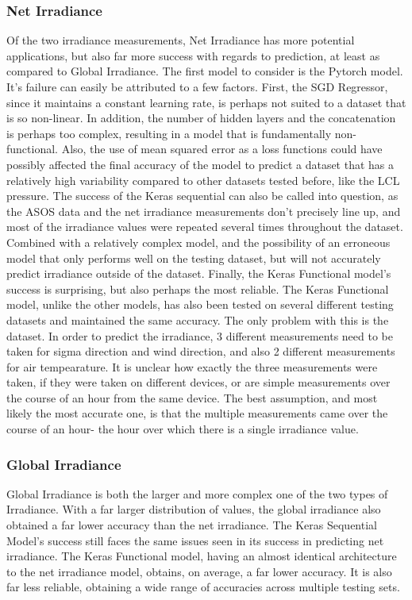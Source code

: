 \documentclass[conference]{IEEEtran}
\begin{document}
\subsubsection{Net Irradiance}
Of the two irradiance measurements, Net Irradiance has more potential applications, but also far more success with regards to prediction, at least as compared to Global Irradiance. The first model to consider is the Pytorch model. It's failure can easily be attributed to a few factors. First, the SGD Regressor, since it maintains a constant learning rate, is perhaps not suited to a dataset that is so non-linear. In addition, the number of hidden layers and the concatenation is perhaps too complex, resulting in a model that is fundamentally non-functional. Also, the use of mean squared error as a loss functions could have possibly affected the final accuracy of the model to predict a dataset that has a relatively high variability compared to other datasets tested before, like the LCL pressure. The success of the Keras sequential can also be called into question, as the ASOS data and the net irradiance measurements don't precisely line up, and most of the irradiance values were repeated several 
times throughout the dataset. Combined with a relatively complex model, and the possibility of an erroneous model that only performs well on the testing dataset, but will not accurately predict irradiance outside of the dataset. Finally, the Keras Functional model's success is surprising, but also perhaps the most reliable. The Keras Functional model, unlike the other models, has also been tested on several different testing datasets and maintained the same accuracy. The only problem with this is the dataset. In order to predict the irradiance, 3 different measurements need to be taken for sigma direction and wind direction, and also 2 different measurements for air tempearature. It is unclear how exactly the three measurements were taken, if they were taken on different devices, or are simple measurements over the course of an hour from the same device. The best assumption, and most likely the most accurate one, is that the multiple measurements came over the course of an hour- the hour over which there is a single irradiance value. 
\subsubsection{Global Irradiance}
Global Irradiance is both the larger and more complex one of the two types of Irradiance. With a far larger distribution of values, the global irradiance also obtained a far lower accuracy than the net irradiance. The Keras Sequential Model's success still faces the same issues seen in its success in predicting net irradiance. The Keras Functional model, having an almost identical architecture to the net irradiance model, obtains, on average, a far lower accuracy. It is also far less reliable, obtaining a wide range of accuracies across multiple testing sets. 
\end{document}
